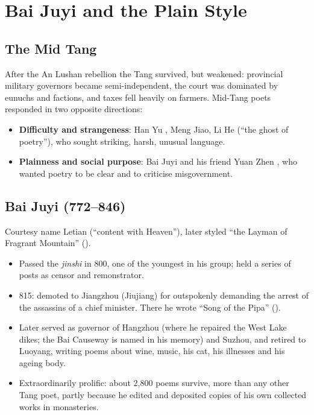 \chapter{Bai Juyi and the Plain Style}

\section{The Mid Tang}

After the An Lushan rebellion the Tang survived, but weakened: provincial military
governors became semi-independent, the court was dominated by eunuchs and factions, and
taxes fell heavily on farmers. Mid-Tang poets responded in two opposite directions:
\begin{itemize}
  \item \textbf{Difficulty and strangeness}: Han Yu , Meng Jiao, Li He
         (``the ghost of poetry''), who sought striking, harsh, unusual language.
  \item \textbf{Plainness and social purpose}: Bai Juyi and his friend Yuan Zhen ,
        who wanted poetry to be clear and to criticise misgovernment.
\end{itemize}

\section{Bai Juyi  (772--846)}

Courtesy name Letian  (``content with Heaven''), later styled ``the Layman of
Fragrant Mountain'' ().

\begin{itemize}
  \item Passed the \emph{jinshi} in 800, one of the youngest in his group; held a series of
        posts as censor and remonstrator.
  \item 815: demoted to Jiangzhou (Jiujiang) for outspokenly demanding the arrest of the
        assassins of a chief minister. There he wrote ``Song of the Pipa'' ().
  \item Later served as governor of Hangzhou (where he repaired the West Lake dikes; the Bai
        Causeway is named in his memory) and
        Suzhou, and retired to Luoyang, writing poems about wine, music, his cat, his
        illnesses and his ageing body.
  \item Extraordinarily prolific: about 2,800 poems survive, more than any other Tang poet,
        partly because he edited and deposited copies of his own collected works in
        monasteries.
\end{itemize}

